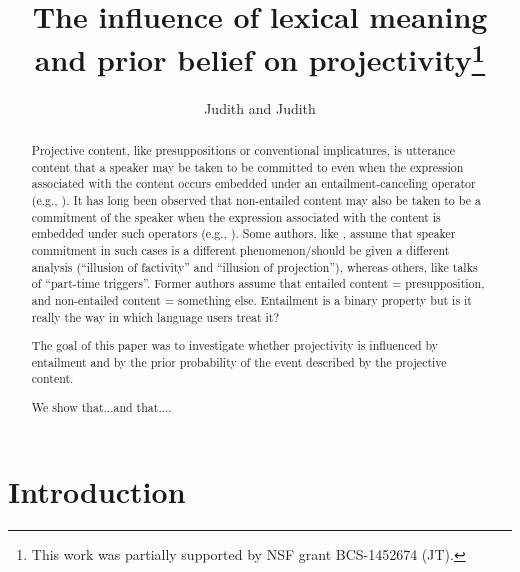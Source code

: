 \documentclass[11pt,fleqn]{article}
\title{The influence of lexical meaning and prior belief on projectivity\thanks{This work was partially supported by NSF grant BCS-1452674 (JT).}}
\author{Judith and Judith}
\newcommand{\6}{\mbox{$[\hspace*{-.6mm}[$}}
\newcommand{\9}{\mbox{$]\hspace*{-.6mm}]$}}
\begin{document}
\maketitle

\begin{abstract}
Projective content, like presuppositions or conventional implicatures, is utterance content that a speaker may be taken to be committed to even when the expression associated with the content occurs embedded under an entailment-canceling operator (e.g., \citealt{ccmg90}). It has long been observed that non-entailed content may also be taken to be a commitment of the speaker when the expression associated with the content is embedded under such operators (e.g., \citealt{simons01,schlenker10,best-question}). Some authors, like \citealt{anand-hacquard2014}, assume that speaker commitment in such cases is a different phenomenon/should be given a different analysis (``illusion of factivity'' and ``illusion of projection''), whereas others, like \citealt{schlenker10} talks of ``part-time triggers''. Former authors assume that entailed content = presupposition, and non-entailed content = something else. Entailment is a binary property but is it really the way in which language users treat it?

The goal of this paper was to investigate whether projectivity is influenced by entailment and by the prior probability of the event described by the projective content.

We show that...and that....
\end{abstract}
			
\section{Introduction}\label{s1}
\end{document}
